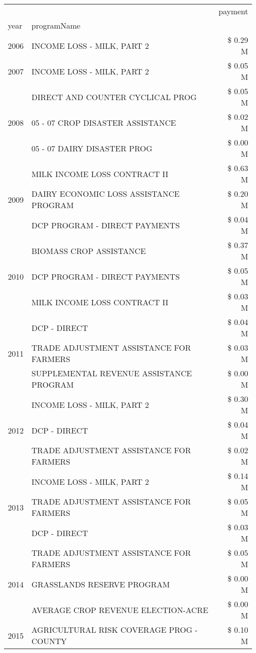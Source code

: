 \begin{tabular}{llr}
\toprule
 &  & payment \\
year & programName &  \\
\midrule
2006 & INCOME LOSS - MILK, PART 2 & \$ 0.29 M \\
\cline{1-3}
2007 & INCOME LOSS - MILK, PART 2 & \$ 0.05 M \\
\cline{1-3}
\multirow[t]{3}{*}{2008} & DIRECT AND COUNTER CYCLICAL PROG & \$ 0.05 M \\
 & 05 - 07 CROP DISASTER ASSISTANCE & \$ 0.02 M \\
 & 05 - 07 DAIRY DISASTER PROG & \$ 0.00 M \\
\cline{1-3}
\multirow[t]{3}{*}{2009} & MILK INCOME LOSS CONTRACT II & \$ 0.63 M \\
 & DAIRY ECONOMIC LOSS ASSISTANCE PROGRAM & \$ 0.20 M \\
 & DCP PROGRAM - DIRECT PAYMENTS & \$ 0.04 M \\
\cline{1-3}
\multirow[t]{3}{*}{2010} & BIOMASS CROP ASSISTANCE & \$ 0.37 M \\
 & DCP PROGRAM - DIRECT PAYMENTS & \$ 0.05 M \\
 & MILK INCOME LOSS CONTRACT II & \$ 0.03 M \\
\cline{1-3}
\multirow[t]{3}{*}{2011} & DCP - DIRECT & \$ 0.04 M \\
 & TRADE ADJUSTMENT ASSISTANCE FOR FARMERS & \$ 0.03 M \\
 & SUPPLEMENTAL REVENUE ASSISTANCE PROGRAM & \$ 0.00 M \\
\cline{1-3}
\multirow[t]{3}{*}{2012} & INCOME LOSS - MILK, PART 2 & \$ 0.30 M \\
 & DCP - DIRECT & \$ 0.04 M \\
 & TRADE ADJUSTMENT ASSISTANCE FOR FARMERS & \$ 0.02 M \\
\cline{1-3}
\multirow[t]{3}{*}{2013} & INCOME LOSS - MILK, PART 2 & \$ 0.14 M \\
 & TRADE ADJUSTMENT ASSISTANCE FOR FARMERS & \$ 0.05 M \\
 & DCP - DIRECT & \$ 0.03 M \\
\cline{1-3}
\multirow[t]{3}{*}{2014} & TRADE ADJUSTMENT ASSISTANCE FOR FARMERS & \$ 0.05 M \\
 & GRASSLANDS RESERVE PROGRAM & \$ 0.00 M \\
 & AVERAGE CROP REVENUE ELECTION-ACRE & \$ 0.00 M \\
\cline{1-3}
\multirow[t]{2}{*}{2015} & AGRICULTURAL RISK COVERAGE PROG - COUNTY & \$ 0.10 M \\

\end{tabular}
